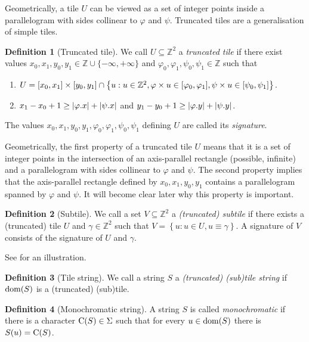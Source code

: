 \documentclass[11pt, letterpaper]{article}
\theoremstyle{plain}
\theoremstyle{definition}
\newtheorem{definition}{Definition}
\theoremstyle{remark}
\newcommand{\Z}{\mathbb{Z}}
\renewcommand{\phi}{\varphi}
\newcommand{\set}[1]{\left\lbrace #1 \right\rbrace}
\begin{document}
Geometrically, a tile $U$ can be viewed as a set of integer points inside a parallelogram with sides collinear to $\phi$ and $\psi$. Truncated tiles are a generalisation of simple tiles. 

\begin{definition}[Truncated tile]
We call $U \subseteq \Z^2$ a \emph{truncated tile} if there exist values $x_0, x_1, y_0, y_1 \in \Z \cup \{-\infty, +\infty\}$ and $\phi_0, \phi_1, \psi_0, \psi_1 \in \Z$ such that 
	\begin{enumerate}
		\item $U = [x_0, x_1] \times [y_0, y_1] \cap \set{u : u \in \Z^2, \h{u} \in [\phi_0, \phi_1], \s{u} \in [\psi_0, \psi_1]}$. 
		\item $x_1 - x_0 + 1 \ge |\x{\phi}| + |\x{\psi}|$ and $y_1 - y_0 + 1 \ge |\y{\phi}| + |\y{\psi}|$. 
	\end{enumerate}
The values $x_0, x_1, y_0, y_1, \phi_0, \phi_1, \psi_0, \psi_1$ defining $U$ are called its \emph{signature}. 
\end{definition}

Geometrically, the first property of a truncated tile $U$ means that it is a set of integer points in the intersection of an axis-parallel rectangle (possible, infinite) and a parallelogram with sides collinear to $\phi$ and $\psi$. The second property implies that the axis-parallel rectangle defined by $x_0, x_1, y_0, y_1$ contains a parallelogram spanned by $\phi$ and $\psi$. It will become clear later why this property is important. 

\begin{definition}[Subtile]\label{subtile_definition}
We call a set $V \subseteq \Z^2$ a \emph{(truncated) subtile} if there exists a (truncated) tile $U$ and $\gamma \in \Z^2$ such that $V = \set{u : u \in U, u \equiv \gamma}$. A signature of $V$ consists of the signature of $U$ and $\gamma$.
\end{definition}

See  for an illustration.

\begin{definition}[Tile string]\label{tile_string_definition}
We call a string $S$ a \emph{(truncated) (sub)tile string} if $\operatorname*{dom}(S)$ is a (truncated) (sub)tile.
\end{definition}

\begin{definition}[Monochromatic string]
A string $S$ is called \emph{monochromatic} if there is a character $\operatorname*{C}(S) \in \Sigma$ such that for every $u \in \operatorname*{dom}(S)$ there is $S(u) = \operatorname*{C}(S)$.  
\end{definition}
\end{document}
